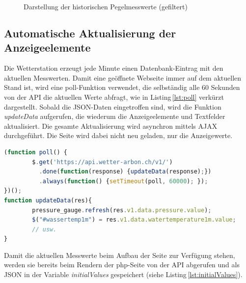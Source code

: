 \begin{figure}[h!]
	\centering
	\caption{Darstellung der historischen Pegelmesswerte (gefiltert)}
	\label{img:histPegel}
\end{figure}



\subsection{Automatische Aktualisierung der Anzeigeelemente}
Die Wetterstation erzeugt jede Minute einen Datenbank-Eintrag mit den aktuellen Messwerten. Damit eine geöffnete Webseite immer auf dem aktuellen Stand ist, wird eine poll-Funktion verwendet, die selbständig alle 60 Sekunden von der API die aktuellen Werte abfragt, wie in Listing\,\ref{lst:poll} verkürzt dargestellt. Sobald die JSON-Daten eingetroffen sind, wird die Funktion \textit{updateData} aufgerufen, die wiederum die Anzeigeelemente und Textfelder aktualisiert. Die gesamte Aktualisierung wird asynchron mittels AJAX durchgeführt. Die Seite wird dabei nicht neu geladen, nur die Anzeigewerte. \newline


\begin{lstlisting}[label=lst:poll,caption=Automatische Aktualisierung der Werte, language=JavaScript, style=htmlcssjs]
(function poll() {
        $.get('https://api.wetter-arbon.ch/v1/')
          .done(function(response) {updateData(response);})
          .always(function() {setTimeout(poll, 60000); });
})();
function updateData(res){
        pressure_gauge.refresh(res.v1.data.pressure.value);
        $("#wassertemp1m") = res.v1.data.watertemperature1m.value;
        // usw.
}
\end{lstlisting}

\noindent
Damit die aktuellen Messwerte beim Aufbau der Seite zur Verfügung stehen, werden sie bereits beim Rendern der php-Seite von der API abgerufen und als JSON in der Variable \emph{initialValues} gespeichert (siehe Listing\,\ref{lst:initialValues}).

